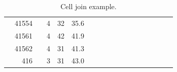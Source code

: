 \begin{table}[ht!]
\begin{tabular}{rrrrrrrrrrrrrrrr}
\colorbox{light-gray}{ 41554} & \colorbox{light-gray}{\ \  4} & \colorbox{light-gray}{ 32} & \multicolumn{1}{r|}{\colorbox{light-gray}{ ﻿35.6}} &  &  &  &  & \multicolumn{1}{r|}{﻿} &  &  &  &  &  &  &  \\ 
\colorbox{light-gray}{ 41561} & \colorbox{light-gray}{\ \  4} & \colorbox{light-gray}{ 42} & \multicolumn{1}{r|}{\colorbox{light-gray}{ ﻿41.9}} &  &  &  &  & \multicolumn{1}{r|}{﻿} &  &  &  &  &  &  &  \\ 
\colorbox{light-gray}{ 41562} & \colorbox{light-gray}{\ \  4} & \colorbox{light-gray}{ 31} & \multicolumn{1}{r|}{\colorbox{light-gray}{ ﻿41.3}} &  &  &  &  & \multicolumn{1}{r|}{﻿} &  &  &  &  &  &  &  \\ 
\colorbox{light-gray}{\ \ \ \  416} & \colorbox{light-gray}{\ \  3} & \colorbox{light-gray}{ 31} & \multicolumn{1}{r|}{\colorbox{light-gray}{ ﻿43.0}} &  &  &  &  & \multicolumn{1}{r|}{﻿} &  &  &  &  &  &  &  \\ 
\end{tabular}
\caption{\label{tab:join} Cell join example.}
\end{table}

